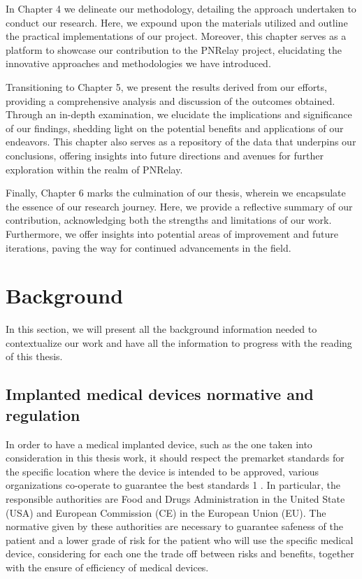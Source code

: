 \documentclass{Configuration_Files/PoliMi3i_thesis}
\begin{document}
In Chapter 4 we delineate our methodology, detailing the approach undertaken to conduct our research. Here, we expound upon the materials utilized and outline the practical implementations of our project. Moreover, this chapter serves as a platform to showcase our contribution to the PNRelay project, elucidating the innovative approaches and methodologies we have introduced.

Transitioning to Chapter 5, we present the results derived from our efforts, providing a comprehensive analysis and discussion of the outcomes obtained. Through an in-depth examination, we elucidate the implications and significance of our findings, shedding light on the potential benefits and applications of our endeavors. This chapter also serves as a repository of the data that underpins our conclusions, offering insights into future directions and avenues for further exploration within the realm of PNRelay.

Finally, Chapter 6 marks the culmination of our thesis, wherein we encapsulate the essence of our research journey. Here, we provide a reflective summary of our contribution, acknowledging both the strengths and limitations of our work. Furthermore, we offer insights into potential areas of improvement and future iterations, paving the way for continued advancements in the field.





\chapter{Background}

In this section, we will present all the background information needed to contextualize our work and have all the information to progress with the reading of this thesis.


\section{Implanted medical devices normative and regulation}

In order to have a medical implanted device, such as the one taken into consideration in this thesis work, it should respect the premarket standards for the specific location where the device is intended to be approved, various organizations co-operate to guarantee the best standards \cite{} 1 . In particular, the responsible authorities are Food and Drugs Administration in the United State (USA) and European Commission (CE) in the European Union (EU). 
The normative given by these authorities are necessary to guarantee safeness of the patient and a lower grade of risk for the patient who will use the specific medical device, considering for each one the trade off between risks and benefits, together with the ensure of efficiency of medical devices.
\end{document}
